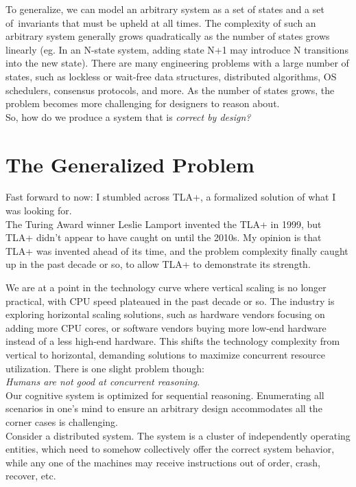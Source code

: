 To generalize, we can model an arbitrary system as a set of states and a set of invariants that must be upheld at all times. The complexity of such an arbitrary system generally grows quadratically as the number of states grows linearly (eg.
In an N-state system, adding state N+1 may introduce N transitions into the new
state). There are many engineering problems with a large number of states, such
as lockless or wait-free data structures, distributed algorithms, OS schedulers,
consensus protocols, and more. As the number of states grows, the problem becomes
more challenging for designers to reason about.\\

So, how do we produce a system that is \textit{correct by design?} 

\section{The Generalized Problem}

Fast forward to now: I stumbled across TLA+, a formalized solution of what I
was looking for.\\

The Turing Award winner Leslie Lamport invented the TLA+ in 1999, but TLA+
didn't appear to have caught on until the 2010s. My opinion is that TLA+ was
invented ahead of its time, and the problem complexity finally caught up in the
past decade or so, to allow TLA+ to demonstrate its strength.\newline

We are at a point in the technology curve where vertical scaling is no
longer practical, with CPU speed plateaued in the past decade or so. The industry
is exploring horizontal scaling solutions, such as hardware vendors focusing on
adding more CPU cores, or software vendors buying more low-end hardware instead
of a less high-end hardware. This shifts the technology complexity from vertical
to horizontal, demanding solutions to maximize concurrent resource
utilization. There is one slight problem though:\\

\textit{Humans are not good at concurrent reasoning}.\\

Our cognitive system is optimized for sequential reasoning. Enumerating
all scenarios in one's mind to ensure an arbitrary design accommodates all
the corner cases is challenging.\\

Consider a distributed system. The system is a cluster of independently operating
entities, which need to somehow collectively offer the correct system behavior,
while any one of the machines may receive instructions out of order, crash,
recover, etc.\\

